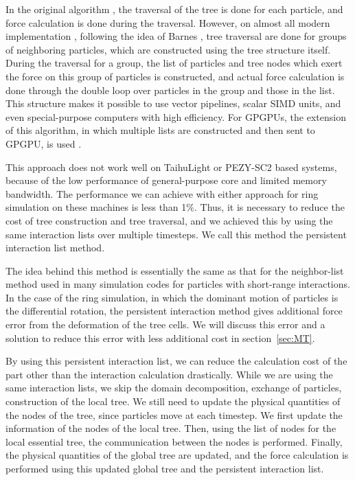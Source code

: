 \documentclass[Afour,sageh,times]{sagej}
\newcommand{\rev}[1]{{#1}}
\begin{document}
In the original algorithm \citep{BarnesHut1986}, the traversal of the
tree is done for each particle, and force calculation is done during
the traversal. However, on almost all modern implementation
\citep{Ishiyamaetal2012, Bedorfetal2014}, following the idea of Barnes
\citep{Barnes1990}, tree traversal are done for groups of neighboring
particles, which are constructed using the tree structure
itself. During the traversal for a group, the list of particles and
tree nodes which exert the force on this group of particles is
constructed, and actual force calculation is done through the double
loop over particles in the group and those in the list. This structure
makes it possible to use vector pipelines, scalar SIMD units, and even
special-purpose computers \citep{Makino1991c} with high
efficiency. For GPGPUs, the extension of this algorithm, in which
multiple lists are constructed and then sent to GPGPU, is used
\citep{Hamadaetal2009}.

This approach does not work well on TaihuLight or PEZY-SC2 based
systems, because of the low performance of general-purpose core and
limited memory bandwidth.  The performance we can achieve with either
approach for ring simulation on these machines is less than 1\%.
Thus, it is necessary to reduce the cost of tree construction and tree
traversal, and we achieved this by using the same interaction lists
over multiple timesteps. We call this method the persistent
interaction list method.

The idea behind this method is essentially the same as that for the
neighbor-list method used in many simulation codes for particles with
short-range interactions. \rev{In the case of the ring simulation, in
  which the dominant motion of particles is the differential rotation,
  the persistent interaction method gives additional force error from
  the deformation of the tree cells. We will discuss this error and a
  solution to reduce this error with less additional cost in
  section~\ref{sec:MT}.}

By using this persistent interaction list, we can reduce the
calculation cost of the part other than the interaction calculation
drastically. While we are using the same interaction lists, we skip
the domain decomposition, exchange of particles, construction of the
local tree. We still need to update the physical quantities of the
nodes of the tree, since particles move at each timestep.  We first
update the information of the nodes of the local tree. Then, using the
list of nodes for the local essential tree, the communication between
the nodes is performed. Finally, the physical quantities of the global
tree are updated, and the force calculation is performed using this
updated global tree and the persistent interaction list.
\end{document}
